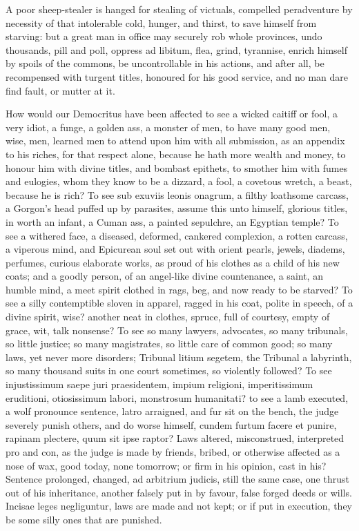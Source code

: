 {A poor sheep-stealer is hanged for stealing of victuals, compelled
peradventure by necessity of that intolerable cold, hunger, and thirst,
to save himself from starving: but a great man in office may
securely rob whole provinces, undo thousands, pill and poll, oppress ad
libitum, flea, grind, tyrannise, enrich himself by spoils of the
commons, be uncontrollable in his actions, and after all, be
recompensed with turgent titles, honoured for his good service, and no
man dare find fault, or  mutter at it.

How would our Democritus have been affected to see a wicked caitiff or
fool, a very idiot, a funge, a golden ass, a monster of men, to
have many good men, wise, men, learned men to attend upon him with all
submission, as an appendix to his riches, for that respect alone,
because he hath more wealth and money, to honour him with divine
titles, and bombast epithets, to smother him with fumes and eulogies,
whom they know to be a dizzard, a fool, a covetous wretch, a beast, \etc{}
because he is rich? To see sub exuviis leonis onagrum, a filthy
loathsome carcass, a Gorgon's head puffed up by parasites, assume this
unto himself, glorious titles, in worth an infant, a Cuman ass, a
painted sepulchre, an Egyptian temple? To see a withered face, a
diseased, deformed, cankered complexion, a rotten carcass, a viperous
mind, and Epicurean soul set out with orient pearls, jewels, diadems,
perfumes, curious elaborate works, as proud of his clothes as a child
of his new coats; and a goodly person, of an angel-like divine
countenance, a saint, an humble mind, a meet spirit clothed in rags,
beg, and now ready to be starved? To see a silly contemptible sloven in
apparel, ragged in his coat, polite in speech, of a divine spirit,
wise? another neat in clothes, spruce, full of courtesy, empty of
grace, wit, talk nonsense?
To see so many lawyers, advocates, so many tribunals, so little
justice; so many magistrates, so little care of common good; so many
laws, yet never more disorders; Tribunal litium segetem, the Tribunal a
labyrinth, so many thousand suits in one court sometimes, so violently
followed? To see injustissimum saepe juri praesidentem, impium
religioni, imperitissimum eruditioni, otiosissimum labori, monstrosum
humanitati? to see a lamb executed, a wolf pronounce sentence,
latro arraigned, and fur sit on the bench, the judge severely punish
others, and do worse himself,  cundem furtum facere et punire,
rapinam plectere, quum sit ipse raptor? Laws altered,
misconstrued, interpreted pro and con, as the judge is made by
friends, bribed, or otherwise affected as a nose of wax, good today,
none tomorrow; or firm in his opinion, cast in his? Sentence prolonged,
changed, ad arbitrium judicis, still the same case, one thrust out
of his inheritance, another falsely put in by favour, false forged
deeds or wills. Incisae leges negliguntur, laws are made and not kept;
or if put in execution, they be some silly ones that are punished.

}
